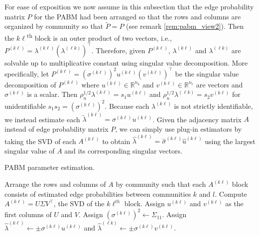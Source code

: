 \documentclass[
  11pt,
]{article}
\theoremstyle{definition}
\theoremstyle{definition}
\theoremstyle{definition}
\theoremstyle{definition}
\theoremstyle{remark}
\begin{document}
For ease of exposition we now assume in this subsection that the edge probability matrix \(P\) for the PABM had been arranged so that the rows and columns are organized by community so that \(\tilde{P} = P\) (see remark \ref{rem:pabm_view2}).
Then the \(k\ell\)\textsuperscript{th} block is an outer product of two vectors, i.e., \(P^{(k \ell)} = \lambda^{(k \ell)} (\lambda^{(\ell k)})^\top\).
Therefore, given \(P^{(k \ell)}\), \(\lambda^{(k \ell)}\) and \(\lambda^{(\ell k)}\) are solvable up to multiplicative constant using singular value decomposition.
More specifically, let \(P^{(k \ell)} = (\sigma^{(k \ell)})^2 u^{(k \ell)} (v^{(k \ell)})^\top\) be the singular value decomposition of \(P^{(k \ell)}\) where \(u^{(k \ell)} \in \mathbb{R}^{n_k}\) and \(v^{(k \ell)} \in \mathbb{R}^{n_\ell}\) are vectors and \(\sigma^{(k \ell)}\) is a scalar.
Then \(\rho_n^{1/2} \lambda^{(k \ell)} = s_1 u^{(k \ell)}\) and \(\rho_n^{1/2} \lambda^{(\ell k)} = s_2 v^{(k \ell)}\) for unidentifiable \(s_1 s_2 = (\sigma^{(k \ell)})^2\).
Because each \(\lambda^{(k \ell)}\) is not strictly identifiable, we instead estimate each \(\tilde{\lambda}^{(k \ell)} = \sigma^{(k \ell)} u^{(k \ell)}\).
Given the adjacency matrix \(A\) instead of edge probability matrix \(P\), we can simply use plug-in estimators by taking the SVD of each \(A^{(k \ell)}\) to obtain \(\hat{\lambda}^{(k \ell)} = \hat{\sigma}^{(k \ell)} \hat{u}^{(k \ell)}\) using the largest singular value of \(A\) and its corresponding singular vectors.

\begin{algorithm}[tp]
  \label{alg:param_est}
  \DontPrintSemicolon
  \SetAlgoLined
  \caption{PABM parameter estimation.}
  Arrange the rows and columns of $A$ by community such that each 
  $A^{(k \ell)}$ block consists of estimated edge probabilities between 
  communities $k$ and $l$.\;
   {
    Compute $A^{(k \ell)} = U \Sigma V^\top$, the SVD of the $k\ell^{th}$ block.\;
    Assign $u^{(k \ell)}$ and $v^{(k \ell)}$ as the first columns of $U$ and $V$. 
    Assign $(\sigma^{(k \ell)})^2 \leftarrow \Sigma_{11}$.\;
    Assign $\hat{\lambda}^{(k \ell)} \leftarrow \pm \sigma^{(k \ell)} u^{(k \ell)}$ and $\hat{\lambda}^{(\ell k)} \leftarrow \pm \sigma^{(k \ell)} v^{(k \ell)}$.
  }
\end{algorithm}
\end{document}
